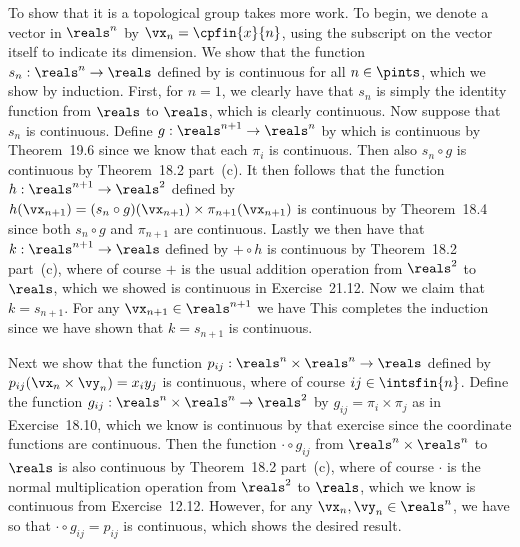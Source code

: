{{    To show that it is a topological group takes more work.
    To begin, we denote a vector in $\reals^n$ by $\vx_n = \cpfin{x}{n}$, using the subscript on the vector itself to indicate its dimension.
    We show that the function $s_n: \reals^n \to \reals$ defined by
    is continuous for all $n \in \pints$, which we show by induction.
    First, for $n = 1$, we clearly have that $s_n$ is simply the identity function from $\reals$ to $\reals$, which is clearly continuous.
    Now suppose that $s_n$ is continuous.
    Define $g : \reals^{n+1} \to \reals^n$ by
    which is continuous by Theorem~19.6 since we know that each $\pi_i$ is continuous.
    Then also $s_n \circ g$ is continuous by Theorem~18.2 part~(c).
    It then follows that the function $h : \reals^{n+1} \to \reals^2$ defined by $h(\vx_{n+1}) = (s_n \circ g)(\vx_{n+1}) \times \pi_{n+1}(\vx_{n+1})$ is continuous by Theorem~18.4 since both $s_n \circ g$ and $\pi_{n+1}$ are continuous.
    Lastly we then have that $k : \reals^{n+1} \to \reals$ defined by $+ \circ h$ is continuous by Theorem~18.2 part~(c), where of course $+$ is the usual addition operation from $\reals^2$ to $\reals$, which we showed is continuous in Exercise~21.12.
    Now we claim that $k = s_{n+1}$.
    For any $\vx_{n+1} \in \reals^{n+1}$ we have
    This completes the induction since we have shown that $k = s_{n+1}$ is continuous.

    Next we show that the function $p_{ij} : \reals^n \times \reals^n \to \reals$ defined by $p_{ij}(\vx_n \times \vy_n) = x_i y_j$ is continuous, where of course $ij \in \intsfin{n}$.
    Define the function $g_{ij}: \reals^n \times \reals^n \to \reals^2$ by $g_{ij} = \pi_i \times \pi_j$ as in Exercise~18.10, which we know is continuous by that exercise since the coordinate functions are continuous.
    Then the function $\cdot \circ g_{ij}$ from $\reals^n \times \reals^n$ to $\reals$ is also continuous by Theorem~18.2 part~(c), where of course $\cdot$ is the normal multiplication operation from $\reals^2$ to $\reals$, which we know is continuous from Exercise~12.12.
    However, for any $\vx_n,\vy_n \in \reals^n$, we have
    so that $\cdot \circ g_{ij} = p_{ij}$ is continuous, which shows the desired result.

}}

